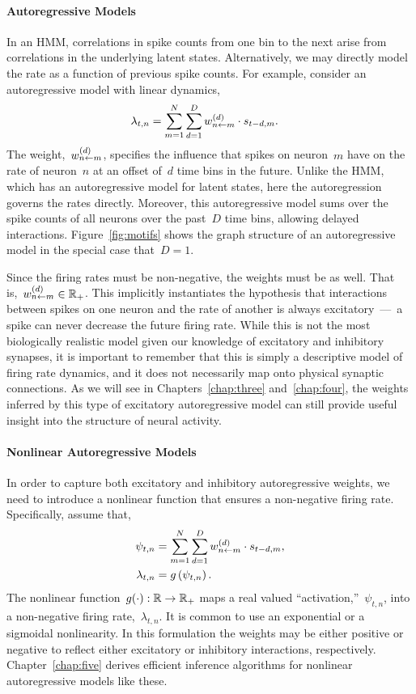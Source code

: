 \paragraph{Autoregressive Models}
In an HMM, correlations in spike counts from one bin to the next arise from 
correlations in the underlying latent states. Alternatively, we may directly 
model the rate as a function of previous spike counts. For example, consider 
an autoregressive model with linear dynamics,
\begin{align}
  \label{eq:ar_model}
  \lambda_{t,n} &= \sum_{m=1}^N \sum_{d=1}^D w_{n \leftarrow m}^{(d)} \cdot s_{t-d, m}.
\end{align}
The weight,~$w_{n \leftarrow m}^{(d)}$, specifies the influence that spikes
on neuron~$m$ have on the rate of neuron~$n$ at an offset of~$d$ time bins
in the future. 
Unlike the HMM, which has an
autoregressive model for latent states, here the
autoregression governs the rates directly.
Moreover, this
autoregressive model sums over the spike counts of all neurons over
the past~$D$ time bins, allowing delayed interactions.
Figure~\ref{fig:motifs} shows the graph structure of an autoregressive model
in the special case that~$D=1$.

Since the
firing rates must be non-negative, the weights must be as well.  That
is,~$w_{n \leftarrow m}^{(d)} \in \mathbb{R}_+$.
This implicitly instantiates
the hypothesis that interactions between spikes on one neuron and
the rate of another is always excitatory~---~a spike can never
decrease the future firing rate. While this is not the most
biologically realistic model given our knowledge of excitatory and
inhibitory synapses, it is important to remember that this is simply a
descriptive model of firing rate dynamics, and it does not necessarily
map onto physical synaptic connections. As we will see in
Chapters~\ref{chap:three} and~\ref{chap:four}, the weights
inferred by this type of excitatory autoregressive model can still
provide useful insight into the structure of neural activity.

\paragraph{Nonlinear Autoregressive Models}
In order to capture both excitatory and inhibitory autoregressive weights,
we need to introduce a nonlinear function that ensures a non-negative firing 
rate. Specifically, assume that,
\begin{align*}
  \psi_{t,n} &= \sum_{m=1}^N \sum_{d=1}^D w_{n \leftarrow m}^{(d)} \cdot s_{t-d,m}, \\
  \lambda_{t,n} &= g \left( \psi_{t,n} \right).
\end{align*}
The nonlinear
function~${g(\cdot): \mathbb{R} \to \mathbb{R}_+}$ 
maps a real valued ``activation,''~$\psi_{t,n}$, into a non-negative
firing rate,~$\lambda_{t,n}$. It is common to use an exponential or a
sigmoidal nonlinearity. In this formulation the
weights may be either positive
or negative to reflect either excitatory or inhibitory interactions,
respectively. Chapter~\ref{chap:five} derives efficient
inference algorithms for nonlinear autoregressive models like these.

